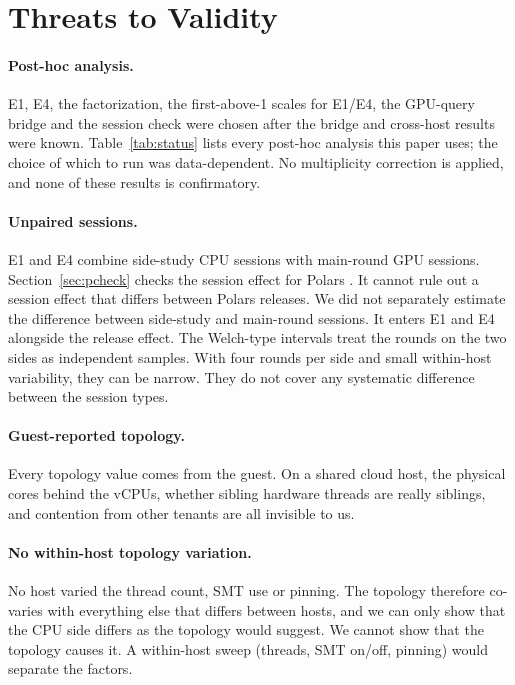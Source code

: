 \documentclass[11pt]{article}
\begin{document}
\section{Threats to Validity}
\label{sec:threats}

\paragraph{Post-hoc analysis.} E1, E4, the factorization, the first-above-1
scales for E1/E4, the GPU-query bridge and the session check were chosen after
the bridge and cross-host results were known. Table~\ref{tab:status} lists every post-hoc analysis this paper
uses; the choice of which to run was data-dependent. No
multiplicity correction is applied, and none of these results is confirmatory.

\paragraph{Unpaired sessions.} E1 and E4 combine side-study CPU sessions with
main-round GPU sessions.
\ifpcheck
Section~\ref{sec:pcheck} checks the session effect for Polars \polarsold{}. It
cannot rule out a session effect that differs between Polars releases.
\fi
\ifpcheck\else
We did not separately estimate the difference between side-study and
main-round sessions. It enters E1 and E4 alongside the release effect.
\fi
The Welch-type intervals treat the rounds on the two sides as independent
samples. With four rounds per side and small within-host variability, they can
be narrow. They do not cover any systematic difference between the session
types.

\paragraph{Guest-reported topology.} Every topology value comes from the
guest. On a shared cloud host, the physical cores behind the vCPUs, whether
sibling hardware threads are really siblings, and contention from other
tenants are all invisible to us.

\paragraph{No within-host topology variation.} No host varied the thread count,
SMT use or pinning. The topology therefore co-varies with everything else that
differs between hosts, and we can only show that the CPU side differs as the
topology would suggest. We cannot show that the topology causes it. A
within-host sweep (threads, SMT on/off, pinning) would separate the factors.
\end{document}
